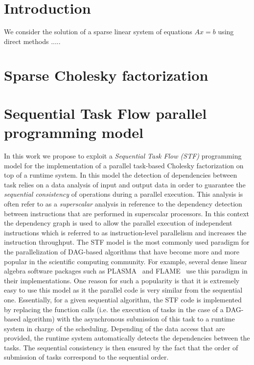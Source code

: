\documentclass{article}
\begin{document}
\newpage
\setcounter{page}{1}

\section{Introduction} \label{sec:introduction}

We consider the solution of a sparse linear system of equations $Ax = b$ 
using direct methods .....


\section{Sparse Cholesky factorization}\label{sec:chol}
\setcounter{equation}{0}
\setcounter{table}{0}
\setcounter{figure}{0}

\section{Sequential Task Flow parallel programming model}\label{sec:runtime}

In this work we propose to exploit a \textit{Sequential Task Flow
  (STF)} programming model for the implementation of a parallel
task-based Cholesky factorization on top of a runtime system. In this
model the detection of dependencies between task relies on a data
analysis of input and output data in order to guarantee the
\textit{sequential consistency} of operations during a parallel
execution. This analysis is often refer to as a \textit{superscalar}
analysis in reference to the dependency detection between instructions
that are performed in superscalar processors. In this context the
dependency graph is used to allow the parallel execution of
independent instructions which is referred to as instruction-level
parallelism and increases the instruction throughput. The STF model is
the most commonly used paradigm for the parallelization of DAG-based
algorithms that have become more and more popular in the scientific
computing community. For example, several dense linear algebra
software packages such as PLASMA~\cite{a.d.d.h.ea:09} and
FLAME~\cite{i.c.q.q.ea:12} use this paradigm in their
implementations. One reason for such a popularity is that it is
extremely easy to use this model as it the parallel code is very
similar from the sequential one. Essentially, for a given sequential
algorithm, the STF code is implemented by replacing the function calls
(i.e. the execution of tasks in the case of a DAG-based algorithm)
with the asynchronous submission of this task to a runtime system in
charge of the scheduling. Depending of the data access that are
provided, the runtime system automatically detects the dependencies
between the tasks. The sequential consistency is then ensured by the
fact that the order of submission of tasks correspond to the
sequential order.
\end{document}
